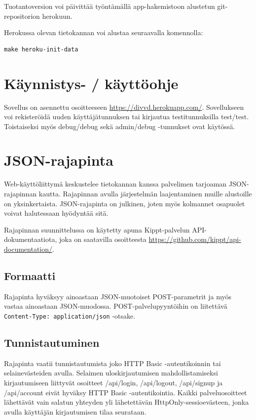\documentclass[a4paper,parskip=half]{scrartcl}
\begin{document}
Tuotantoversion voi päivittää työntämällä app-hakemistoon alustetun
git-repositorion herokuun.

Herokussa olevan tietokannan voi alustaa seuraavalla komennolla:
\begin{Verbatim}
make heroku-init-data
\end{Verbatim}

\section{Käynnistys- / käyttöohje}
Sovellus on asennettu osoitteeseen \url{https://divvd.herokuapp.com/}.
Sovellukseen voi rekisteröidä uuden käyttäjätunnuksen tai kirjautua
testitunnuksilla test/test. Toistaiseksi myös debug/debug sekä admin/debug
-tunnukset ovat käytössä.

\section{JSON-rajapinta}

Web-käyttöliittymä keskustelee tietokannan kanssa palvelimen tarjoaman
JSON-rajapinnan kautta. Rajapinnan avulla järjestelmän laajentaminen muille
alustoille on yksinkertaista. JSON-rajapinta on julkinen, joten myös kolmannet
osapuolet voivat halutessaan hyödyntää sitä.

Rajapinnan suunnittelussa on käytetty apuna Kippt-palvelun API-dokumentaatiota,
joka on saatavilla osoitteesta
\url{https://github.com/kippt/api-documentation/}.

\subsection{Formaatti}

Rajapinta hyväksyy ainoastaan JSON-muotoiset POST-parametrit ja myös vastaa
ainoastaan JSON-muodossa. POST-palvelupyyntöihin on liitettävä
\texttt{Content-Type: application/json} -otsake.

\subsection{Tunnistautuminen}

Rajapinta vaatii tunnistautumista joko HTTP Basic -autentikoinnin tai
selainevästeiden avulla.  Selaimen uloskirjautumisen mahdollistamiseksi
kirjautumiseen liittyvät osoitteet /api/login, /api/logout, /api/signup ja
/api/account eivät hyväksy HTTP Basic -autentikointia. Kaikki palveluosoitteet
lähettävät vain salatun yhteyden yli lähetettävän HttpOnly-sessioevästeen,
jonka avulla käyttäjän kirjautumisen tilaa seurataan.
\end{document}
